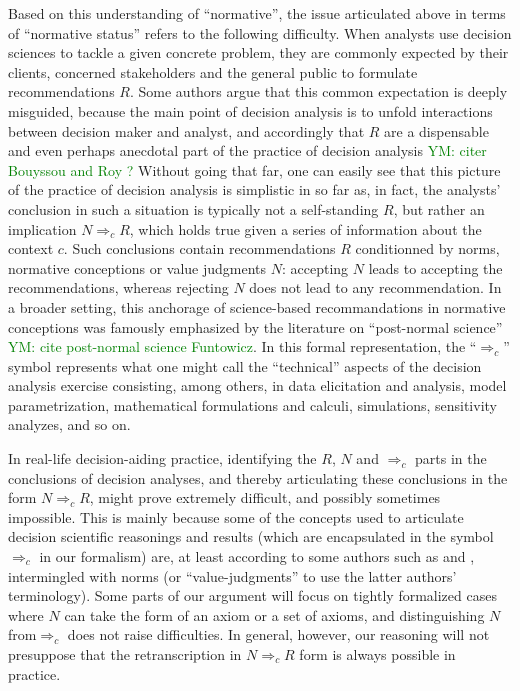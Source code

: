 \documentclass[preprint, french, english, 11pt, authoryear]{elsarticle}%
\newcommand{\commentYM}[1]{\textcolor{green}{YM: #1}}
\begin{document}
Based on this understanding of “normative”, the issue articulated above in terms of “normative status” refers to the following difficulty. When analysts use decision sciences to tackle a given concrete problem, they are commonly expected by their clients, concerned stakeholders and the general public to formulate recommendations $R$. Some authors argue that this common expectation is deeply misguided, because the main point of decision analysis is to unfold interactions between decision maker and analyst, and accordingly that $R$ are a dispensable and even perhaps anecdotal part of the practice of decision analysis \commentYM{citer Bouyssou and Roy ?} Without going that far, one can easily see that this picture of the practice of decision analysis is simplistic in so far as, in fact, the analysts' conclusion in such a situation is typically not a self-standing $R$, but rather an implication $N ⇒_c R$, which holds true given a series of information about the context $c$. Such conclusions contain recommendations $R$ conditionned by norms, normative conceptions or value judgments $N$: accepting  $N$ leads to accepting the recommendations, whereas rejecting $N$ does not lead to any recommendation. In a broader setting, this anchorage of science-based recommandations in normative conceptions was famously emphasized by the literature on ``post-normal science'' \commentYM{cite post-normal science Funtowicz}. In this formal representation, the “$⇒_c $” symbol represents what one might call the “technical” aspects of the decision analysis exercise consisting, among others, in data elicitation and analysis, model parametrization, mathematical formulations and calculi, simulations, sensitivity analyzes, and so on.


In real-life decision-aiding practice, identifying the $R$, $N$ and $⇒_c$ parts in the conclusions of decision analyses, and thereby articulating these conclusions in the form $N ⇒_c R$, might prove extremely difficult, and possibly sometimes impossible. This is mainly because some of the concepts used to articulate decision scientific reasonings and results (which are encapsulated in the symbol $⇒_c$ in our formalism) are, at least according to some authors such as \citet{mongin_value_2006} and \citet{baujard_value_2013}, intermingled with norms (or “value-judgments” to use the latter authors' terminology). Some parts of our argument will focus on tightly formalized cases where $N$ can take the form of an axiom or a set of axioms, and distinguishing $N$ from$⇒_c$ does not raise difficulties. In general, however, our reasoning will not presuppose that the retranscription in $N ⇒_c R$ form is always possible in practice.
\end{document}
